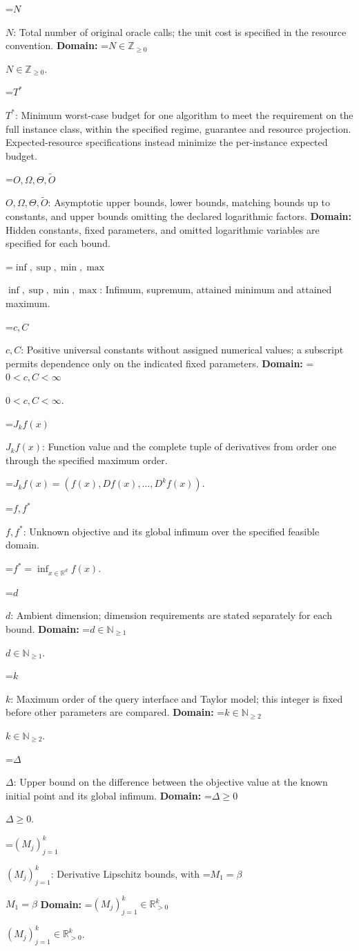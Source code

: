 \documentclass[10pt,a4paper]{article}
\newcommand{\AtlasMath}[1]{\par\begingroup\centering\setbox0=\hbox{$\displaystyle #1$}\ifdim\wd0>1.4\linewidth\typeout{ATLAS WIDE FORMULA: \the\wd0}\fi\ifdim\wd0>\linewidth\resizebox{\linewidth}{!}{\box0}\else\box0\fi\par\endgroup}
\newcommand{\AtlasInlineMath}[1]{\begingroup\setbox0=\hbox{$#1$}\ifdim\wd0>.4\linewidth\endgroup\AtlasMath{#1}\else\endgroup$#1$\fi}
\begin{document}
\AtlasInlineMath{N}: Total number of original oracle calls; the unit cost is specified in the resource convention. \textbf{Domain:} \AtlasInlineMath{N\in\mathbb{Z}_{\ge0}}.

\AtlasInlineMath{T^*}: Minimum worst-case budget for one algorithm to meet the requirement on the full instance class, within the specified regime, guarantee and resource projection. Expected-resource specifications instead minimize the per-instance expected budget.

\AtlasInlineMath{O,\Omega,\Theta,\widetilde{O}}: Asymptotic upper bounds, lower bounds, matching bounds up to constants, and upper bounds omitting the declared logarithmic factors. \textbf{Domain:} Hidden constants, fixed parameters, and omitted logarithmic variables are specified for each bound.

\AtlasInlineMath{\inf,\sup,\min,\max}: Infimum, supremum, attained minimum and attained maximum.

\AtlasInlineMath{c,C}: Positive universal constants without assigned numerical values; a subscript permits dependence only on the indicated fixed parameters. \textbf{Domain:} \AtlasInlineMath{0<c,C<\infty}.

\AtlasInlineMath{J_{k}f(x)}: Function value and the complete tuple of derivatives from order one through the specified maximum order.


\AtlasMath{J_{k}f(x)=(f(x),Df(x),\ldots,D^{k}f(x)).}


\AtlasInlineMath{f,f^*}: Unknown objective and its global infimum over the specified feasible domain.


\AtlasMath{f^*=\inf_{x\in \mathbb{R}^d}f(x).}


\AtlasInlineMath{d}: Ambient dimension; dimension requirements are stated separately for each bound. \textbf{Domain:} \AtlasInlineMath{d\in\mathbb{N}_{\ge1}}.

\AtlasInlineMath{k}: Maximum order of the query interface and Taylor model; this integer is fixed before other parameters are compared. \textbf{Domain:} \AtlasInlineMath{k\in\mathbb{N}_{\ge2}}.

\AtlasInlineMath{\Delta}: Upper bound on the difference between the objective value at the known initial point and its global infimum. \textbf{Domain:} \AtlasInlineMath{\Delta\ge0}.

\AtlasInlineMath{(M_j)_{j=1}^k}: Derivative Lipschitz bounds, with \AtlasInlineMath{M_1=\beta} \textbf{Domain:} \AtlasInlineMath{(M_j)_{j=1}^k\in\mathbb{R}_{>0}^k}.
\end{document}
